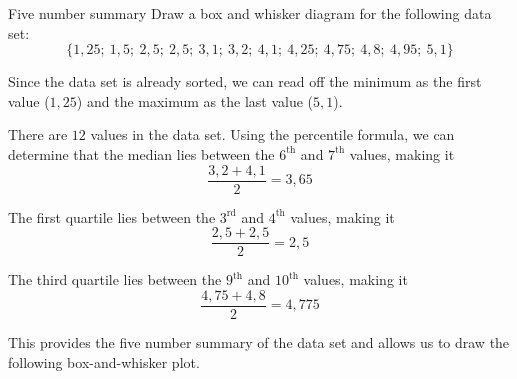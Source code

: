 \begin{wex}{Five number summary}
{Draw a box and whisker diagram for the following data set:
    \begin{equation*}
      \{1,25;\ 1,5;\ 2,5;\ 2,5;\ 3,1;\ 3,2;\ 4,1;\ 4,25;\ 4,75;\ 4,8;\ 4,95;\ 5,1\}
    \end{equation*}
}{

  Since the data set is already sorted, we can read off the minimum as
  the first value ($1,25$) and the maximum as the last value ($5,1$).


  There are $12$ values in the data set. Using the percentile formula,
  we can determine that the median lies between the $6^{\mathrm{th}}$ and $7^{\mathrm{th}}$
  values, making it
  \begin{equation*}
    \frac{3,2 + 4,1}{2} = 3,65
  \end{equation*}

  The first quartile lies between the $3^{\mathrm{rd}}$ and $4^{\mathrm{th}}$ values, making
  it
  \begin{equation*}
    \frac{2,5 + 2,5}{2} = 2,5
  \end{equation*}

  The third quartile lies between the $9^{\mathrm{th}}$ and $10^{\mathrm{th}}$ values, making
  it
  \begin{equation*}
    \frac{4,75 + 4,8}{2} = 4,775
  \end{equation*}

  This provides the five number summary of the data set and allows us
  to draw the following box-and-whisker plot.

  \begin{center}
  \end{center}
}
\end{wex}

